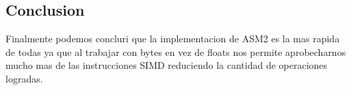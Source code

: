

\subsection{Conclusion}
Finalmente podemos concluri que la implementacion de ASM2 es la mas rapida de todas ya que al trabajar con bytes en vez de floats nos permite aprobecharnos mucho mas de las instrucciones SIMD reduciendo la cantidad de operaciones logradas.

